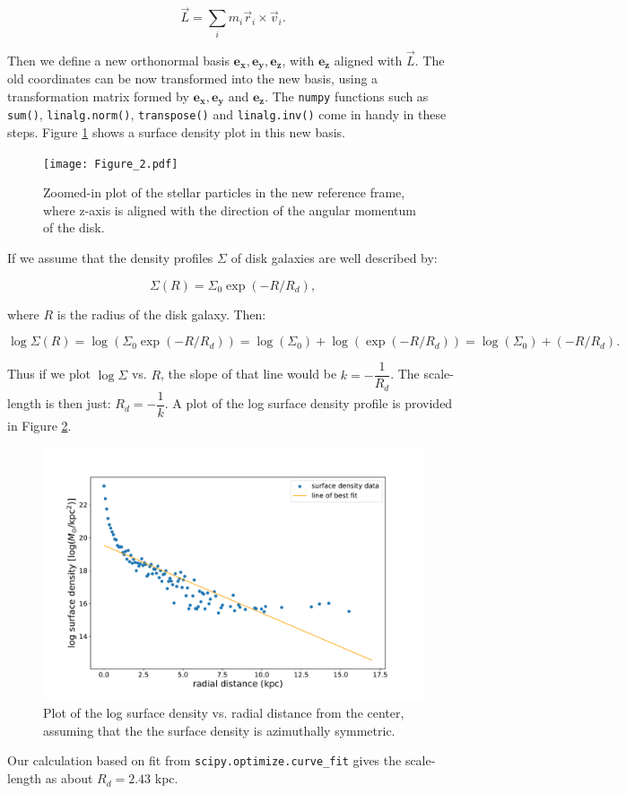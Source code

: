 \documentclass[12pt]{article}
\begin{document}
\begin{equation} \label{eq:1}
    \Vec{L} = \sum_i m_i \Vec{r}_i \times \Vec{v}_i .
\end{equation}


Then we define a new orthonormal basis $\boldsymbol{e_x}, \boldsymbol{e_y}, \boldsymbol{e_z}$, with $\boldsymbol{e_z}$ aligned with $\Vec{L}$. The old coordinates can be now transformed into the new basis, using a transformation matrix formed by $\boldsymbol{e_x}, \boldsymbol{e_y}$ and $\boldsymbol{e_z}$. The \texttt{numpy} functions such as \texttt{sum()}, \texttt{linalg.norm()}, \texttt{transpose()} and \texttt{linalg.inv()} come in handy in these steps. Figure \ref{Fig2} shows a surface density plot in this new basis.


\begin{figure}[ht]
    \centering
    \texttt{[image: Figure\_2.pdf]}
    \caption{Zoomed-in plot of the stellar particles in the new reference frame, where z-axis is aligned with the direction of the angular momentum of the disk.}
    \label{Fig2}
\end{figure}


If we assume that the density profiles $\Sigma$ of disk galaxies are well described by:

$$ \Sigma(R) = \Sigma_0 \exp(-R/R_d),$$

where $R$ is the radius of the disk galaxy. Then:

$$\log \Sigma(R) = \log(\Sigma_0 \exp(-R/R_d)) = \log(\Sigma_0) + \log(\exp(-R/R_d)) = \log(\Sigma_0) + (-R/R_d).$$

Thus if we plot $\log \Sigma$ vs. $R$, the slope of that line would be $k = -\dfrac{1}{R_d}$. The scale-length is then just: $R_d = -\dfrac{1}{k}$. A plot of the log surface density profile is provided in Figure \ref{Fig3}.

\begin{figure}[ht]
    \centering
    \includegraphics[scale = 0.5]{Figure_3.pdf}
    \caption{Plot of the log surface density vs. radial distance from the center, assuming that the the surface density is azimuthally symmetric.}
    \label{Fig3}
\end{figure}

Our calculation based on fit from \texttt{scipy.optimize.curve\_fit} gives the scale-length as about
$R_d =  2.43$ kpc.
\end{document}
